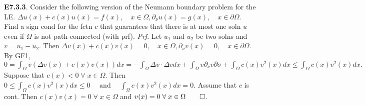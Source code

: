 { \bf E7.3.3}. Consider the following version of the Neumann boundary problem for the LE. $ \Delta u(x) + c(x) u(x) = f(x), \quad x \in \Omega, \partial_{\nu} u(x) = g(x), \quad x \in \partial \Omega$. Find a sign cond for the fctn $c$ that guarantees that there is at most one soln $u$ even if $\Omega$ is not path-connected (with prf). {\it Prf}.  Let $u_1$ and $u_2$ be two solns and $v = u_1 - u_2$. Then $\Delta v(x) + c(x) v(x) = 0, \quad x \in \Omega, \partial_{\nu} v(x) = 0, \quad x \in \partial \Omega$. By GF1, $0 = \int_{\Omega} v(\Delta v(x) + c(x) v(x))dx = - \int_{\Omega} \Delta v \cdot \Delta v dx +\int_{\Omega} v \partial_{\nu} v \partial \sigma +\int_{\Omega} c(x) v^2(x) dx  \leq \int_{\Omega} c(x) v^2(x) dx.$ Suppose that $c(x) < 0\; \forall \; x \in \Omega$. Then $0 \leq \int_{\Omega} c(x) v^2(x) dx \leq 0 \quad \text{ and } \quad \int_{\Omega} c(x) v^2(x) dx = 0.$
Assume that $c$ is cont. Then $c(x) v(x) = 0\; \forall \; x \in \Omega$ and $v(x) = 0\; \forall \; x \in \Omega \qed$. 
